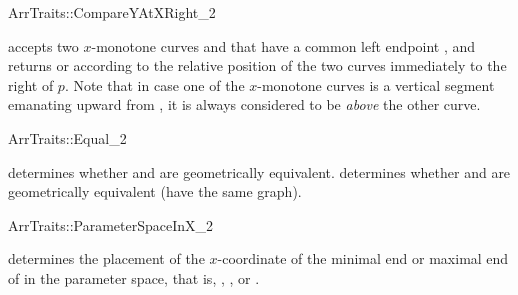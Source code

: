 \ccRefPageBegin
\begin{ccRefConcept}{ArrTraits::CompareYAtXRight_2}

\ccHasModels{}

  {accepts two $x$-monotone curves  and 
  that have a common left endpoint , and returns  or  according to the relative position of the two
  curves immediately to the right of $p$. Note that in case one of the
  $x$-monotone curves is a vertical segment emanating upward from
  , it is always considered to be {\sl above} the other curve.}
\end{ccRefConcept}
\ccRefPageEnd

\ccRefPageBegin
\begin{ccRefConcept}{ArrTraits::Equal_2}

\ccHasModels{}

  {determines whether  and  are geometrically 
  equivalent.}
\ccGlue
{}
  {determines whether  and  are
  geometrically equivalent (have the same graph).}
\end{ccRefConcept}
\ccRefPageEnd

\ccRefPageBegin
\begin{ccRefConcept}{ArrTraits::ParameterSpaceInX_2}

\ccHasModels{}

  {determines the placement of the $x$-coordinate of the minimal end or 
  maximal end of  in the parameter space, that is,
  , , or .}
\end{ccRefConcept}
\ccRefPageEnd

